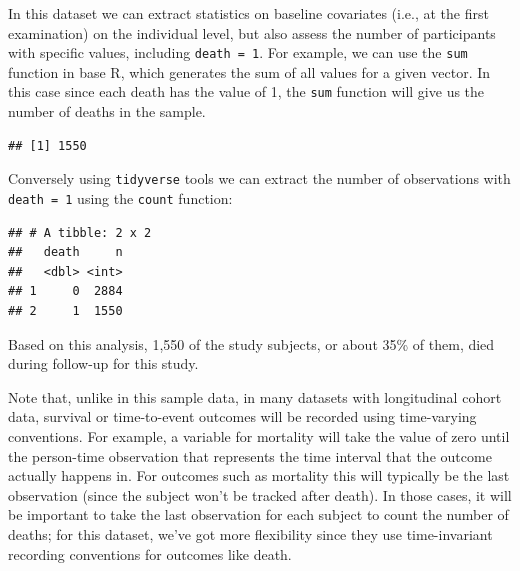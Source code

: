 \documentclass[
]{book}
\newenvironment{Shaded}{\begin{snugshade}}{\end{snugshade}}
\newcommand{\KeywordTok}[1]{\textcolor[rgb]{0.13,0.29,0.53}{\textbf{#1}}}
\newcommand{\NormalTok}[1]{#1}
\newcommand{\OperatorTok}[1]{\textcolor[rgb]{0.81,0.36,0.00}{\textbf{#1}}}
\newcommand{\StringTok}[1]{\textcolor[rgb]{0.31,0.60,0.02}{#1}}
\begin{document}
In this dataset we can extract statistics on baseline covariates (i.e., at the first examination) on the individual level, but also assess the number of participants with specific values, including \texttt{death\ =\ 1}. For example, we can use the \texttt{sum} function in base R, which generates the sum of all values for a given vector. In this case since each death has the value of 1, the \texttt{sum} function will give us the number of deaths in the sample.

\begin{Shaded}
\end{Shaded}

\begin{verbatim}
## [1] 1550
\end{verbatim}

Conversely using \texttt{tidyverse} tools we can extract the number of observations with \texttt{death\ =\ 1} using the \texttt{count} function:

\begin{Shaded}
\end{Shaded}

\begin{verbatim}
## # A tibble: 2 x 2
##   death     n
##   <dbl> <int>
## 1     0  2884
## 2     1  1550
\end{verbatim}

Based on this analysis, 1,550 of the study subjects, or about 35\% of them, died during follow-up for this study.

Note that, unlike in this sample data, in many datasets with longitudinal cohort data, survival or time-to-event outcomes will be recorded using time-varying conventions. For example, a variable for mortality will take the value of zero until the person-time observation that represents the time interval that the outcome actually happens in. For outcomes such as mortality this will typically be the last observation (since the subject won't be tracked after death). In those cases, it will be important to take the last observation for each subject to count the number of deaths; for this dataset, we've got more flexibility since they use time-invariant recording conventions for outcomes like death.
\end{document}

